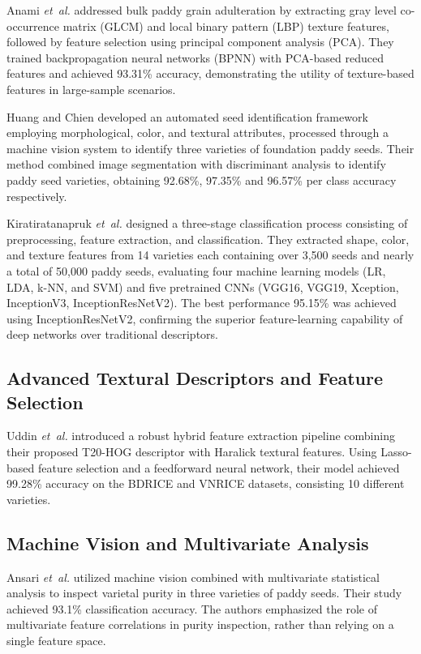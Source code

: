 \documentclass[conference]{IEEEtran}
\begin{document}
Anami \textit{et~al.} \cite{ANAMI201947} addressed bulk paddy grain adulteration by extracting gray level co-occurrence matrix (GLCM) and local binary pattern (LBP) texture features, followed by feature selection using principal component analysis (PCA). They trained backpropagation neural networks (BPNN) with PCA-based reduced features and achieved 93.31\% accuracy, demonstrating the utility of texture-based features in large-sample scenarios. 

Huang and Chien \cite{s17040809} developed an automated seed identification framework employing morphological, color, and textural attributes, processed through a machine vision system to identify three varieties of foundation paddy seeds. Their method combined image segmentation with discriminant analysis to identify paddy seed varieties, obtaining 92.68\%, 97.35\% and 96.57\% per class accuracy respectively.

Kiratiratanapruk \textit{et~al.} \cite{https://doi.org/10.1155/2020/7041310} designed a three-stage classification process consisting of preprocessing, feature extraction, and classification. They extracted shape, color, and texture features from 14 varieties each containing over 3,500 seeds and nearly a total of 50,000 paddy seeds, evaluating four machine learning models (LR, LDA, k-NN, and SVM) and five pretrained CNNs (VGG16, VGG19, Xception, InceptionV3, InceptionResNetV2). The best performance 95.15\% was achieved using InceptionResNetV2, confirming the superior feature-learning capability of deep networks over traditional descriptors.

\subsection{Advanced Textural Descriptors and Feature Selection}

Uddin \textit{et~al.} \cite{Uddin2022} introduced a robust hybrid feature extraction pipeline combining their proposed T20-HOG descriptor with Haralick textural features. Using Lasso-based feature selection and a feedforward neural network, their model achieved 99.28\% accuracy on the BDRICE and VNRICE datasets, consisting 10 different varieties.

\subsection{Machine Vision and Multivariate Analysis}

Ansari \textit{et~al.} \cite{ANSARI2021100109} utilized machine vision combined with multivariate statistical analysis to inspect varietal purity in three varieties of paddy seeds. Their study achieved 93.1\% classification accuracy. The authors emphasized the role of multivariate feature correlations in purity inspection, rather than relying on a single feature space.
\end{document}
